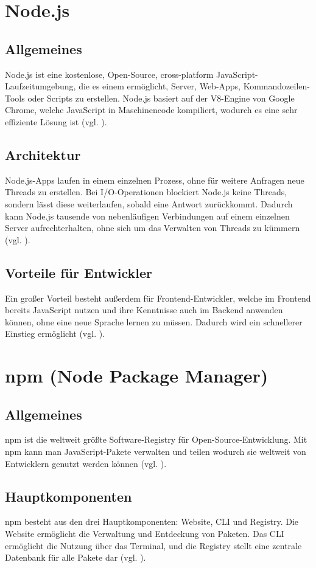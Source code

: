 \documentclass[oneside]{ausarbeitung}
\begin{document}
\section{Node.js}
\subsection{Allgemeines}
Node.js ist eine kostenlose, Open-Source, cross-platform JavaScript-Laufzeitumgebung, die es einem ermöglicht, Server, Web-Apps, Kommandozeilen-Tools oder Scripts zu erstellen. Node.js basiert auf der V8-Engine von Google Chrome, welche JavaScript in Maschinencode kompiliert, wodurch es eine sehr effiziente Lösung ist (vgl. \parencite{nodejs}).

\subsection{Architektur}
Node.js-Apps laufen in einem einzelnen Prozess, ohne für weitere Anfragen neue Threads zu erstellen. Bei I/O-Operationen blockiert Node.js keine Threads, sondern lässt diese weiterlaufen, sobald eine Antwort zurückkommt. Dadurch kann Node.js tausende von nebenläufigen Verbindungen auf einem einzelnen Server aufrechterhalten, ohne sich um das Verwalten von Threads zu kümmern (vgl. \parencite{nodejs}).

\subsection{Vorteile für Entwickler}
Ein großer Vorteil besteht außerdem für Frontend-Entwickler, welche im Frontend bereits JavaScript nutzen und ihre Kenntnisse auch im Backend anwenden können, ohne eine neue Sprache lernen zu müssen. Dadurch wird ein schnellerer Einstieg ermöglicht (vgl. \parencite{nodejs}).

\section{npm (Node Package Manager)}
\subsection{Allgemeines}
npm ist die weltweit größte Software-Registry für Open-Source-Entwicklung. Mit npm kann man JavaScript-Pakete verwalten und teilen wodurch sie weltweit von Entwicklern genutzt werden können (vgl. \parencite{npm}). 

\subsection{Hauptkomponenten}
npm besteht aus den drei Hauptkomponenten: Website, CLI und Registry. Die Website ermöglicht die Verwaltung und Entdeckung von Paketen. Das CLI ermöglicht die Nutzung über das Terminal, und die Registry stellt eine zentrale Datenbank für alle Pakete dar (vgl. \parencite{npm}).
\end{document}
